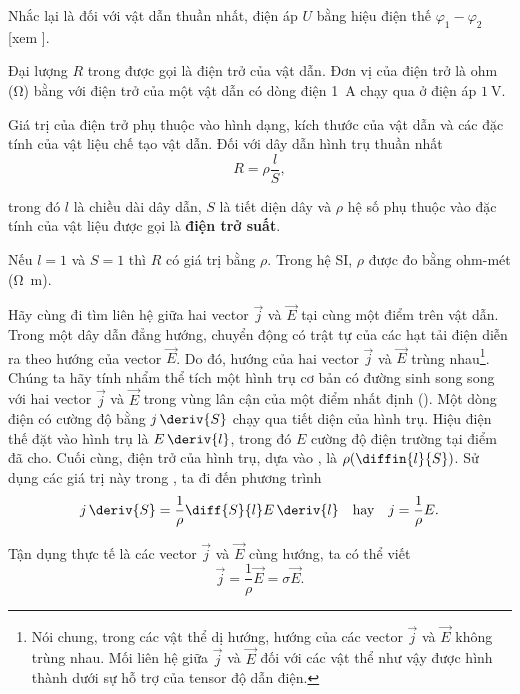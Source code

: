 \noindent
Nhắc lại là đối với vật dẫn thuần nhất, điện áp $U$ bằng hiệu điện thế $\varphi_1-\varphi_2$ [xem ].

Đại lượng $R$ trong  được gọi là {điện trở} của vật dẫn. Đơn vị của điện trở là ohm (\si{\ohm}) bằng với điện trở của một vật dẫn có dòng điện \SI{1}{\ampere} chạy qua ở điện áp $\SI{1}{\volt}$.

Giá trị của điện trở phụ thuộc vào hình dạng, kích thước của vật dẫn và các đặc tính của vật liệu chế tạo vật dẫn. Đối với dây dẫn hình trụ thuần nhất
\begin{equation}\label{eq:5_21}
    R = \rho \frac{l}{S},
\end{equation}

\noindent
trong đó $l$ là chiều dài dây dẫn, $S$ là tiết diện dây và $\rho$ hệ số phụ thuộc vào đặc tính của vật liệu được gọi là \textbf{điện trở suất}.

Nếu $l=1$ và $S=1$ thì $R$ có giá trị bằng $\rho$. Trong hệ SI, $\rho$ được đo bằng ohm-mét (\si{\ohm\metre}).

Hãy cùng đi tìm liên hệ giữa hai vector $\vec{j}$ và $\vec{E}$ tại cùng một điểm trên vật dẫn. Trong một dây dẫn đẳng hướng, chuyển động có trật tự của các hạt tải điện diễn ra theo hướng của vector $\vec{E}$. Do đó, hướng của hai vector $\vec{j}$ và $\vec{E}$ trùng nhau\footnote{Nói chung, trong các vật thể dị hướng, hướng của các vector $\vec{j}$ và $\vec{E}$ không trùng nhau. Mối liên hệ giữa $\vec{j}$ và $\vec{E}$ đối với các vật thể như vậy được hình thành dưới sự hỗ trợ của tensor độ dẫn điện.}. Chúng ta hãy tính nhẩm thể tích một hình trụ cơ bản có đường sinh song song với hai vector $\vec{j}$ và $\vec{E}$ trong vùng lân cận của một điểm nhất định (). Một dòng điện có cường độ bằng $j\,\deriv{S}$ chạy qua tiết diện của hình trụ. Hiệu điện thế đặt vào hình trụ là $E\,\deriv{l}$, trong đó $E$ cường độ điện trường tại điểm đã cho. Cuối cùng, điện trở của hình trụ, dựa vào , là $\rho(\diffin{l}{S})$. Sử dụng các giá trị này trong , ta đi đến phương trình
\begin{equation*}
    j\, \deriv{S} = \frac{1}{\rho} \diff{S}{l} E\, \deriv{l}\quad \text{hay}\quad j = \frac{1}{\rho} E.
\end{equation*}

\noindent
Tận dụng thực tế là các vector $\vec{j}$ và $\vec{E}$ cùng hướng, ta có thể viết
\begin{equation}\label{eq:5_22}
    \vec{j} = \frac{1}{\rho} \vec{E} = \sigma \vec{E}.
\end{equation}

